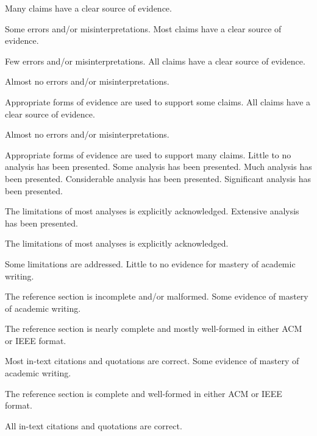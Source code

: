\documentclass{../../fal_assignment}
\begin{document}
\begin{markingrubric}
        \grade 		Many claims have a clear source of evidence.
        \par 		Some errors and/or misinterpretations.
        \grade 		Most claims have a clear source of evidence.
        \par 		Few errors and/or misinterpretations.
        \grade 		All claims have a clear source of evidence.
        \par 		Almost no errors and/or misinterpretations.
        \par 		Appropriate forms of evidence are used to support some claims.
        \grade 		All claims have a clear source of evidence.
        \par 		Almost no errors and/or misinterpretations.
      \par 		Appropriate forms of evidence are used to support many claims.
%
        \grade  \fail	Little to no analysis has been presented.
        \grade 		Some analysis has been presented. 
        \grade 		Much analysis has been presented.
        \grade 		Considerable analysis has been presented.
        \grade 		Significant analysis has been presented.
         \par		The limitations of most analyses is explicitly acknowledged.
         \grade 		Extensive analysis has been presented.
         \par		The limitations of most analyses is explicitly acknowledged.
	\par		Some limitations are addressed.
%
        \grade  \fail	Little to no evidence for mastery of academic writing.
        \par 		The reference section is incomplete and/or malformed.
        \grade 		Some evidence of mastery of academic writing.
        \par 		The reference section is nearly complete and mostly well-formed in either ACM or IEEE format.
        \par 		Most in-text citations and quotations are correct.
        \grade 		Some evidence of mastery of academic writing.
        \par 		The reference section is complete and well-formed in either ACM or IEEE format.
        \par 		All in-text citations and quotations are correct.

\end{markingrubric}
\end{document}
